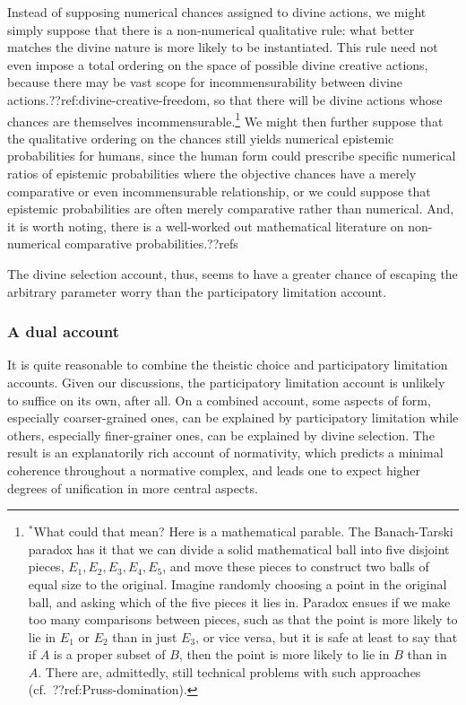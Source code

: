 Instead of supposing numerical chances assigned to divine actions, we might simply suppose that there is a non-numerical qualitative 
rule: what better matches the divine nature is more likely to be instantiated. This rule need not even impose a total ordering on the
space of possible divine creative actions, because there may be vast scope for incommensurability between divine actions.??ref:divine-creative-freedom,
so that there will be divine actions whose chances are themselves incommensurable.\footnote{$^*$What could that mean? Here is a mathematical
parable. The Banach-Tarski paradox has it that we can divide a solid mathematical ball into five disjoint pieces, $E_1,E_2,E_3,E_4,E_5$, and move these pieces to 
construct two balls of equal size to the original. Imagine randomly choosing a point in the original ball, and asking which of the
five pieces it lies in. Paradox ensues if we make too many comparisons between pieces, such as that the point is more likely to lie in 
$E_1$ or $E_2$ than in just $E_3$, or vice versa, but it is safe at least to say that if $A$ is a proper subset of $B$, then the point is more likely to lie in $B$ than
in $A$. There are, admittedly, still technical problems with such approaches (cf.\ ??ref:Pruss-domination).} We might then further suppose that the qualitative ordering on the chances still yields numerical epistemic probabilities for humans, since the human form could prescribe specific numerical ratios of epistemic probabilities where the objective chances
have a merely comparative or even incommensurable relationship, or we could suppose that epistemic probabilities
are often merely comparative rather than numerical. And, it is worth noting, there is a well-worked
out mathematical literature on non-numerical comparative probabilities.??refs

The divine selection account, thus, seems to have a greater chance of escaping the arbitrary parameter worry than the 
participatory limitation account.

\subsubsection{A dual account}
It is quite reasonable to combine the theistic choice and participatory limitation accounts. Given our discussions, 
the participatory limitation account is unlikely to suffice on its own, after all.
On a combined account, some aspects of form, especially coarser-grained ones, can be explained by participatory 
limitation while others, especially finer-grainer ones, can be explained by divine selection. The result is an explanatorily rich account of 
normativity, which predicts a minimal coherence throughout a normative complex, and leads one to expect higher degrees of unification
in more central aspects.


